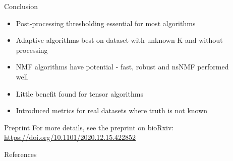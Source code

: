 \documentclass[xcolor=table,final]{beamer}
\newlength{\sepwid}
\newlength{\onecolwid}
\newlength{\twocolwid}
\begin{document}
\begin{frame}[t]
\begin{columns}[t]
\begin{column}{\twocolwid}
\begin{columns}
\begin{column}{\onecolwid}
\begin{table}[t!]
\begin{tabular}{ l | r | r }
\end{tabular}
\end{table}

\end{column} %
\end{columns} %


\end{column} %

\begin{column}{\sepwid}\end{column} %
\begin{column}{\onecolwid} %


\begin{block}{Conclusion}

\begin{itemize}
    \item Post-processing thresholding essential for most algorithms
    \item Adaptive algorithms best on dataset with unknown K and without processing
    \item NMF algorithms have potential - fast, robust and nsNMF performed well
    \item Little benefit found for tensor algorithms
    \item Introduced metrics for real datasets where truth is not known
\end{itemize}

\end{block}

\begin{alertblock}{Preprint}
For more details, see the preprint on bioRxiv: \\
\small \url{https://doi.org/10.1101/2020.12.15.422852}
\end{alertblock}


\begin{block}{References}


\end{block}
\end{column}
\end{columns}
\end{frame}
\end{document}
